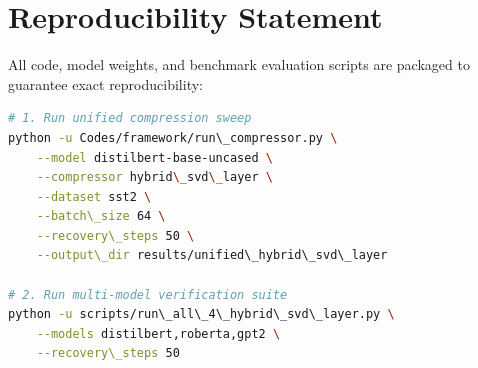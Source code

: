 \section{Reproducibility Statement}
All code, model weights, and benchmark evaluation scripts are packaged to guarantee exact reproducibility:
\begin{lstlisting}[language=bash]
# 1. Run unified compression sweep
python -u Codes/framework/run\_compressor.py \
    --model distilbert-base-uncased \
    --compressor hybrid\_svd\_layer \
    --dataset sst2 \
    --batch\_size 64 \
    --recovery\_steps 50 \
    --output\_dir results/unified\_hybrid\_svd\_layer

# 2. Run multi-model verification suite
python -u scripts/run\_all\_4\_hybrid\_svd\_layer.py \
    --models distilbert,roberta,gpt2 \
    --recovery\_steps 50
\end{lstlisting}
